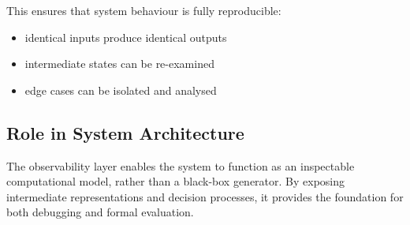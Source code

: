 This ensures that system behaviour is fully reproducible:

\begin{itemize}
\item
  identical inputs produce identical outputs
\item
  intermediate states can be re-examined
\item
  edge cases can be isolated and analysed
\end{itemize}

\subsection{Role in System Architecture}\label{role-in-system-architecture-5}

The observability layer enables the system to function as an inspectable
computational model, rather than a black-box generator. By exposing
intermediate representations and decision processes, it provides the
foundation for both debugging and formal evaluation.
